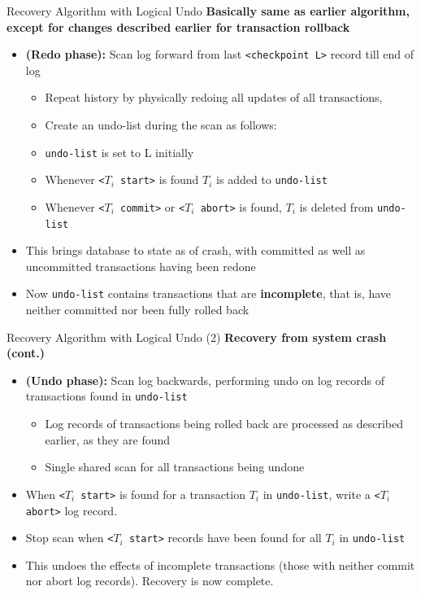 \documentclass[aspectratio=169, xcolor=dvipsnames]{beamer}
\begin{document}
\begin{frame}{Recovery Algorithm with Logical Undo}
    \textbf{Basically same as earlier algorithm, except for changes described earlier for transaction rollback}
    \begin{itemize}[<+->]
        \item \textbf{(Redo phase):} Scan log forward from last \texttt{<checkpoint L>} record till end of log
        \begin{itemize}
            \item[$\triangleright$] Repeat history by physically redoing all updates of all transactions,
            \item[$\triangleright$] Create an undo-list during the scan as follows:
            \item[$\bullet$] \texttt{undo-list} is set to L initially
            \item[$\bullet$] Whenever \texttt{<$T_i$ start>} is found $T_i$ is added to \texttt{undo-list}
            \item[$\bullet$] Whenever \texttt{<$T_i$ commit>} or \texttt{<$T_i$ abort>} is found, $T_i$ is deleted from \texttt{undo-list}
        \end{itemize}
        \item This brings database to state as of crash, with committed as well as uncommitted transactions having been redone
        \item Now \texttt{undo-list} contains transactions that are \textbf{incomplete}, that is, have neither committed nor been fully rolled back
    \end{itemize}
\end{frame}

\begin{frame}{Recovery Algorithm with Logical Undo (2)}
    \textbf{Recovery from system crash (cont.)}
    \begin{itemize}[<+->]
        \item \textbf{(Undo phase):} Scan log backwards, performing undo on log records of transactions found in \texttt{undo-list}
        \begin{itemize}
            \item[$\triangleright$] Log records of transactions being rolled back are processed as described earlier, as they are found
            \item[$\triangleright$] Single shared scan for all transactions being undone
        \end{itemize}
        \item When \texttt{<$T_i$ start>} is found for a transaction $T_i$ in \texttt{undo-list}, write a \texttt{<$T_i$ abort>} log record.
        \item Stop scan when \texttt{<$T_i$ start>} records have been found for all $T_i$ in \texttt{undo-list}
        \item This undoes the effects of incomplete transactions (those with neither commit nor abort log records). Recovery is now complete.
    \end{itemize}
\end{frame}
\end{document}
